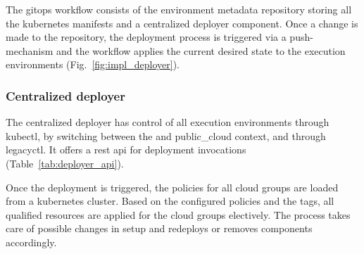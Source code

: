 \documentclass[../main.tex]{subfiles}
\begin{document}
    The \gls{gitops} workflow consists of the environment metadata repository storing all the \gls{kubernetes} manifests and a centralized \gls{deployer} component.
    Once a change is made to the repository, the deployment process is triggered via a push-mechanism and the workflow applies the current desired state to the execution environments (Fig.~\ref{fig:impl_deployer}).

    

    \subsubsection{Centralized deployer}

    The centralized \gls{deployer} has control of all execution environments through \gls{kubectl}, by switching between the  and \gls{public_cloud} context, and through \gls{legacyctl}.
    It offers a \acrshort{rest} \acrshort{api} for deployment invocations (Table~\ref{tab:deployer_api}).

    

    Once the deployment is triggered, the policies for all \gls{cloud} groups are loaded from a \gls{kubernetes} cluster.
    Based on the configured policies and the tags, all qualified resources are applied for the \gls{cloud} groups electively.
    The process takes care of possible changes in setup and redeploys or removes components accordingly.
\end{document}
